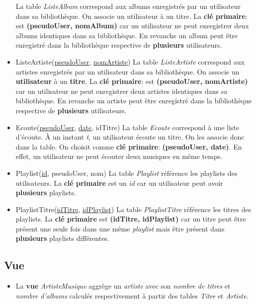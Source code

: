 \documentclass[a4paper,10pt, french]{report}
\begin{document}
\begin{itemize}
        La table \emph{ListeAlbum} correspond aux albums enregistrés par un utilisateur dans sa bibliothèque. On associe un utilisateur à un titre. La \textbf{clé primaire}: est \textbf{(pseudoUser, nomAlbum)} car un utilisateur ne peut enregistrer deux albums identiques dans sa bibliothèque. En revanche un album peut être enregistré dans la bibliothèque respective de \textbf{plusieurs} utilisateurs.
      \item ListeArtiste(\underline{pseudoUser}, \underline{nomArtiste}) \newline
        La table \emph{ListeArtiste} correspond aux artistes enregistrés par un utilisateur dans sa bibliothèque. On associe un \textbf{utilisateur} à un \textbf{titre}. La \textbf{clé primaire}: est \textbf{(pseudoUser, nomArtiste)} car un utilisateur ne peut enregistrer deux artistes identiques dans sa bibliothèque. En revanche un artiste peut être enregistré dans la bibliothèque respective de \textbf{plusieurs} utilisateurs.
      \item Ecoute(\underline{pseudoUser}, \underline{date}, idTitre) \newline
        La table \emph{Ecoute} correspond à une liste d'écoute. À un instant \emph{t}, un utilisateur écoute un titre. On les associe donc dans la table. On choisit comme \textbf{clé primaire}: \textbf{(pseudoUser, date)}. En effet, un utilisateur ne peut écouter deux musiques en même temps.
      \item Playlist(\underline{id}, pseudoUser, nom) \newline
        La table \emph{Playlist} référence les playlists des utilisateurs. La \textbf{clé primaire} est un \emph{id} car un utilisateur peut avoir \textbf{plusieurs} playlists.
      \item PlaylistTitre(\underline{idTitre}, \underline{idPlaylist}) \newline
        La table \emph{PlaylistTitre} référence les titres des playlists. La \textbf{clé primaire} est \textbf{(idTitre, idPlaylist)} car un titre peut être présent une seule fois dans une même \emph{playlist} mais être présent dans \textbf{plusieurs} playlists différentes.
    \end{itemize}
  \subsection{Vue}
    \begin{itemize}
       \item  La \textbf{vue} \emph{ArtisteMusique} aggrège un \emph{artiste} avec son \emph{nombre de titres} et \emph{nombre d'albums} calculés respectivement à partir des tables \emph{Titre} et \emph{Artiste}.
    \end{itemize}
\end{document}
